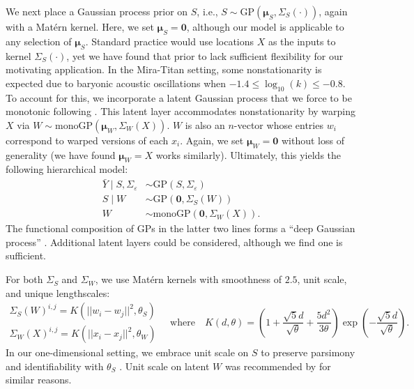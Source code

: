 \documentclass[11pt]{article}
\begin{document}
We next place a Gaussian process prior on $S$, i.e.,
$S\sim \mathrm{GP}\left(\boldsymbol{\mu}_S, \Sigma_S(\cdot)\right)$, again with a 
Mat\'ern kernel. Here, we set $\boldsymbol{\mu}_S=\mathbf{0}$, although our model
is applicable to any selection of $\boldsymbol{\mu}_S$. Standard practice would 
use locations $X$ as the inputs to kernel $\Sigma_S(\cdot)$, yet we have found that 
prior to lack sufficient flexibility for our motivating
application.  In the Mira-Titan setting, some nonstationarity is expected due to 
baryonic acoustic oscillations when $-1.4 \leq \log_{10}(k) \leq -0.8$. To account 
for this, we incorporate a latent Gaussian process that we force to be monotonic
following \citet[][denoted ``monoGP'']{barnett2025monotonic}.  This latent layer
accommodates nonstationarity by warping $X$ via 
$W \sim \mathrm{monoGP}\left(\boldsymbol{\mu}_W, \Sigma_W(X)\right)$.
$W$ is also an $n$-vector whose entries $w_i$ correspond to warped versions of each $x_i$.
Again, we set $\boldsymbol{\mu}_W = \mathbf{0}$ without loss of generality (we have
found $\boldsymbol{\mu}_W = X$ works similarly).
Ultimately, this yields the following hierarchical model:
\begin{equation}\label{eq:dgphm}
\begin{aligned}
\bar{Y}\mid S,\Sigma_\varepsilon &\sim \mathrm{GP}(S,\Sigma_\varepsilon) \\
S\mid W &\sim \mathrm{GP}\left(\mathbf{0}, \Sigma_S(W)\right) \\
W &\sim \mathrm{monoGP}\left(\mathbf{0}, \Sigma_W(X)\right).
\end{aligned}
\end{equation}
The functional composition of GPs in the latter two lines forms a ``deep Gaussian process'' 
\citep{damianou2013deep,dunlop2018deep}. Additional latent layers could be considered, 
although we find one is sufficient.

For both $\Sigma_S$ and $\Sigma_W$, we use Mat\'ern kernels with smoothness of $2.5$,
unit scale, and unique lengthscales:
\begin{equation}\label{eq:cov}
\begin{array}{l}
\Sigma_S(W)^{i,j} = K\left(||w_i - w_j||^2, \theta_S\right) \\[7pt]
\Sigma_W(X)^{i,j} = K\left(||x_i - x_j||^2, \theta_W\right)
\end{array}
\quad\textrm{where}\quad
K(d, \theta) = \left( 1 + \frac{\sqrt{5}d}{\sqrt{\theta}} + 
  \frac{5d^2}{3\theta}\right) \exp\left(-\frac{\sqrt{5}d}{\sqrt{\theta}}\right).
\end{equation}
In our one-dimensional setting, we embrace unit scale on $S$ to preserve parsimony 
and identifiability with $\theta_S$ \citep{zhang2004inconsistent}.
Unit scale on latent $W$ was recommended by \citet{sauer2023active} for similar reasons.
\end{document}
